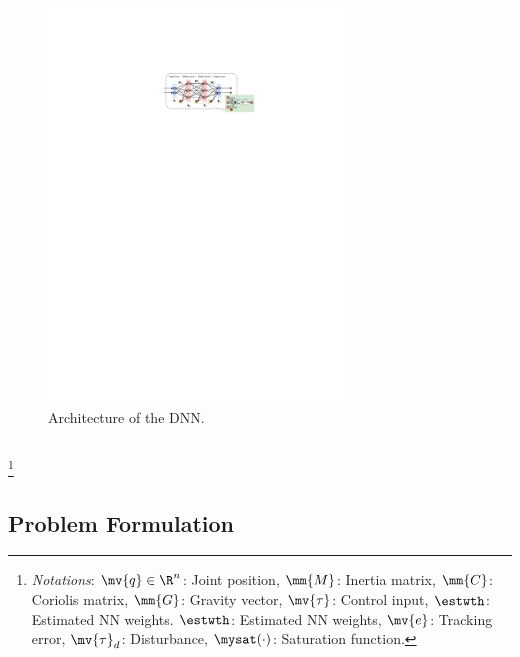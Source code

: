 \documentclass[8pt, aspectratio=169]{beamer}
\begin{document}
\begin{frame}{\insertsubsectionhead}
\begin{columns}
      \begin{figure}
        \includegraphics[width=0.7\textwidth]{figures/DNN.drawio.pdf}
        \caption{Architecture of the DNN.}
      \end{figure}

  \end{columns}

    \let\thefootnote\relax\footnote{
      \textit{Notations}: 
        $\mv{q}\in\R^n$: Joint position, $\mm{M}$: Inertia matrix, $\mm{C}$: Coriolis matrix, $\mm{G}$: Gravity vector, $\mv{\tau}$: Control input, $\estwth$: Estimated NN weights.
        $\estwth$: Estimated NN weights, $\mv{e}$: Tracking error, $\mv{\tau}_d$: Disturbance, $\mysat(\cdot)$: Saturation function.
      }

\end{frame}

\subsection{Problem Formulation}
\end{document}
